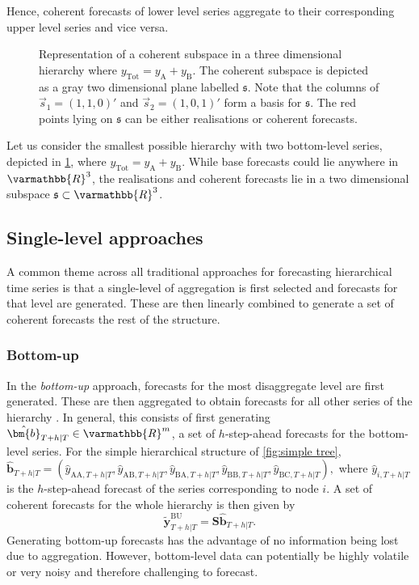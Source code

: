 {Hence, coherent forecasts of lower level series aggregate to their corresponding upper level series and vice versa.

\begin{figure}[!b]
	\centering
	\vspace{-0.9cm}
	\small
	\caption{Representation of a coherent subspace in a three dimensional hierarchy where $y_{\text{Tot}} = y_{\text{A}} + y_{\text{B}}$. The coherent subspace is depicted as a gray two dimensional plane labelled $\mathfrak{s}$. Note that the columns of $\vec{s}_1 = (1,1,0)'$ and $\vec{s}_2 = (1, 0, 1)'$ form a basis for $\mathfrak{s}$. The red points lying on $\mathfrak{s}$ can be either realisations or coherent forecasts.}\label{fig:Schematic-3D}
\end{figure}

Let us consider the smallest possible hierarchy with two bottom-level series, depicted in \ref{fig:Schematic-3D}, where $y_{\text{Tot}} = y_{\text{A}} + y_{\text{B}}$. While base forecasts could lie anywhere in $\varmathbb{R}^3$, the realisations and coherent forecasts lie in a two dimensional subspace $\mathfrak{s}\subset \varmathbb{R}^3$.

\subsection{Single-level approaches}\label{sec:single level approaches}
A common theme across all traditional approaches for forecasting hierarchical time series is that a single-level of aggregation is first selected and forecasts for that level are generated. These are then linearly combined to generate a set of coherent forecasts the rest of the structure.

\subsubsection{Bottom-up}

In the \textit{bottom-up} approach, forecasts for the most disaggregate level are first generated. These are then aggregated to obtain forecasts for all other series of the hierarchy \citep{dunn1976}. In general, this consists of first generating $\hat{\bm{b}}_{T+h|T} \in \varmathbb{R}^m$, a set of $h$-step-ahead forecasts for the bottom-level series. For the simple hierarchical structure of \ref{fig:simple tree}, $\hat{\bm{b}}_{T+h|T} = (\hat{{y}}_{\text{AA},T+h|T}, \hat{{y}}_{\text{AB},T+h|T}, \hat{{y}}_{\text{BA},T+h|T}, \hat{{y}}_{\text{BB},T+h|T},\hat{{y}}_{\text{BC},T+h|T}),$ where $\hat{{y}}_{i,T+h|T}$ is the $h$-step-ahead forecast of the series corresponding to node $i$. A set of coherent forecasts for the whole hierarchy is then given by
\begin{equation*}\label{eq:BU}
	\tilde{\bm{y}}^{\text{BU}}_{T+h|T}=\bm{S\hat{\bm{b}}}_{T+h|T}.
\end{equation*}
Generating bottom-up forecasts has the advantage of no information being lost due to aggregation. However, bottom-level data can potentially be highly volatile or very noisy and therefore challenging to forecast.

}
